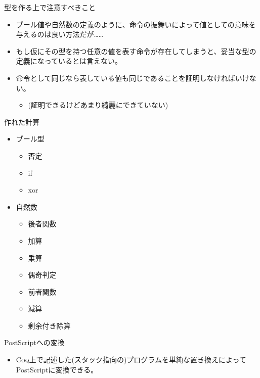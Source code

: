 \documentclass[cjk, 14pt, dvipdfm]{beamer}
\newcommand{\Coq}{{\scshape{}Coq}}
\begin{document}
\begin{frame}{型を作る上で注意すべきこと}

  \begin{itemize}
    \item ブール値や自然数の定義のように、命令の振舞いによって値としての意味を与えるのは良い方法だが……
    \item もし仮にその型を持つ任意の値を表す命令が存在してしまうと、妥当な型の定義になっているとは言えない。
    \item 命令として同じなら表している値も同じであることを証明しなければいけない。
    \begin{itemize}
      \item (証明できるけどあまり綺麗にできていない)
    \end{itemize}
  \end{itemize}

\end{frame}

\begin{frame}{作れた計算}

  \begin{itemize}
    \item ブール型
    \begin{itemize}
      \item 否定
      \item if
      \item xor
    \end{itemize}
    \item 自然数
    \begin{itemize}
      \item 後者関数
      \item 加算
      \item 乗算
      \item 偶奇判定
      \item 前者関数
      \item 減算
      \item 剰余付き除算
    \end{itemize}
  \end{itemize}

\end{frame}

\begin{frame}{PostScriptへの変換}

  \begin{itemize}
    \item \Coq{}上で記述した(スタック指向の)プログラムを単純な置き換えによってPostScriptに変換できる。
  \end{itemize}

\end{frame}
\end{document}
